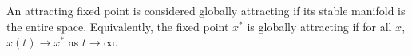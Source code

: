 \documentclass[12pt]{article}
\begin{document}
An attracting fixed point is considered globally attracting if its stable manifold is the entire space.  Equivalently, the fixed point $x^*$ is globally attracting if for all $x$, $x(t)\to x^*$ as $t\to\infty$.
\end{document}
